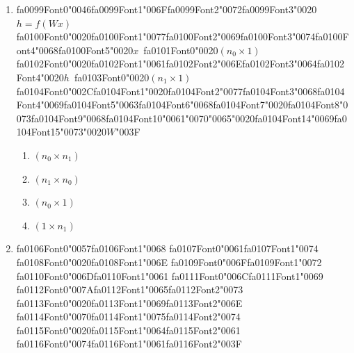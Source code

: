 \documentclass[12pt]{article}
\begin{document}
\begin{enumerate}[label=Q\arabic*.]
\item {\csname fa0099Font0\endcsname\char"0046}{\csname fa0099Font1\endcsname\char"006F}{\csname fa0099Font2\endcsname\char"0072}{\csname fa0099Font3\endcsname\char"0020}$h = f(Wx)${\csname fa0100Font0\endcsname\char"0020}{\csname fa0100Font1\endcsname\char"0077}{\csname fa0100Font2\endcsname\char"0069}{\csname fa0100Font3\endcsname\char"0074}{\csname fa0100Font4\endcsname\char"0068}{\csname fa0100Font5\endcsname\char"0020}$x$\ {\csname fa0101Font0\endcsname\char"0020}$(n_0 \times 1)${\csname fa0102Font0\endcsname\char"0020}{\csname fa0102Font1\endcsname\char"0061}{\csname fa0102Font2\endcsname\char"006E}{\csname fa0102Font3\endcsname\char"0064}{\csname fa0102Font4\endcsname\char"0020}$h$\ {\csname fa0103Font0\endcsname\char"0020}$(n_1 \times 1)${\csname fa0104Font0\endcsname\char"002C}{\csname fa0104Font1\endcsname\char"0020}{\csname fa0104Font2\endcsname\char"0077}{\csname fa0104Font3\endcsname\char"0068}{\csname fa0104Font4\endcsname\char"0069}{\csname fa0104Font5\endcsname\char"0063}{\csname fa0104Font6\endcsname\char"0068}{\csname fa0104Font7\endcsname\char"0020}{\csname fa0104Font8\endcsname\char"0073}{\csname fa0104Font9\endcsname\char"0068}{\csname fa0104Font10\endcsname\char"0061}{\char"0070}{\char"0065}{\char"0020}{\csname fa0104Font14\endcsname\char"0069}{\csname fa0104Font15\endcsname\char"0073}{\char"0020}$W${\char"003F}
\begin{enumerate}[label=(\Alph*)]
    \item $(n_0 \times n_1)$
    \item $(n_1 \times n_0)$
    \item $(n_0 \times 1)$
    \item $(1 \times n_1)$
\end{enumerate}
\item {\csname fa0106Font0\endcsname\char"0057}{\csname fa0106Font1\endcsname\char"0068} {\csname fa0107Font0\endcsname\char"0061}{\csname fa0107Font1\endcsname\char"0074} {\csname fa0108Font0\endcsname\char"0020}{\csname fa0108Font1\endcsname\char"006E} {\csname fa0109Font0\endcsname\char"006F}{\csname fa0109Font1\endcsname\char"0072} {\csname fa0110Font0\endcsname\char"006D}{\csname fa0110Font1\endcsname\char"0061} {\csname fa0111Font0\endcsname\char"006C}{\csname fa0111Font1\endcsname\char"0069} {\csname fa0112Font0\endcsname\char"007A}{\csname fa0112Font1\endcsname\char"0065}{\csname fa0112Font2\endcsname\char"0073} {\csname fa0113Font0\endcsname\char"0020}{\csname fa0113Font1\endcsname\char"0069}{\csname fa0113Font2\endcsname\char"006E} {\csname fa0114Font0\endcsname\char"0070}{\csname fa0114Font1\endcsname\char"0075}{\csname fa0114Font2\endcsname\char"0074} {\csname fa0115Font0\endcsname\char"0020}{\csname fa0115Font1\endcsname\char"0064}{\csname fa0115Font2\endcsname\char"0061} {\csname fa0116Font0\endcsname\char"0074}{\csname fa0116Font1\endcsname\char"0061}{\csname fa0116Font2\endcsname\char"003F}

\end{enumerate}
\end{document}

